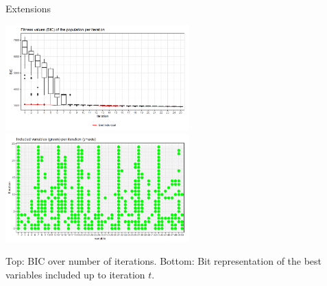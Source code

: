 \documentclass[11pt,compress,t,notes=noshow, xcolor=table]{beamer}
\begin{document}
\begin{vbframe}{Extensions}
        \begin{center}
            \includegraphics[width=0.53\textwidth]{figure/var-selection1.png}
            \includegraphics[width=0.53\textwidth]{figure/var-selection2.png}
     \end{center}
    \vspace{-0.5cm}
Top: BIC over number of iterations. Bottom: Bit representation of the best variables included up to iteration $t$.
\end{vbframe}



\end{document}
